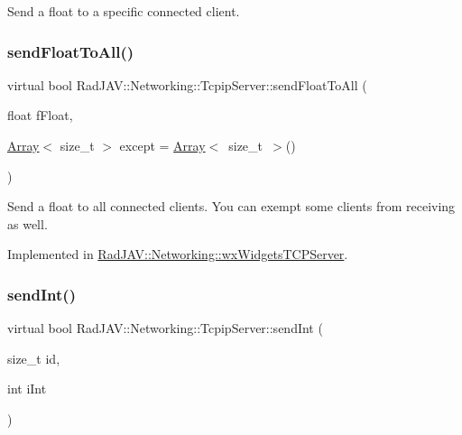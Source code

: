 Send a float to a specific connected client. \mbox{\label{class_rad_j_a_v_1_1_networking_1_1_tcpip_server_acbcaf04e37feb1dd153fcf719a408bc0}} 
\subsubsection{\texorpdfstring{send\+Float\+To\+All()}{sendFloatToAll()}}
{\footnotesize\ttfamily virtual bool Rad\+J\+A\+V\+::\+Networking\+::\+Tcpip\+Server\+::send\+Float\+To\+All (\begin{DoxyParamCaption}\item[{float}]{f\+Float,  }\item[{\mbox{\hyperlink{class_rad_j_a_v_1_1_array}{Array}}$<$ size\+\_\+t $>$}]{except = {\ttfamily \mbox{\hyperlink{class_rad_j_a_v_1_1_array}{Array}}$<$~size\+\_\+t~$>$()} }\end{DoxyParamCaption})\hspace{0.3cm}{\ttfamily [pure virtual]}}

Send a float to all connected clients. You can exempt some clients from receiving as well. 

Implemented in \mbox{\hyperlink{class_rad_j_a_v_1_1_networking_1_1wx_widgets_t_c_p_server_a632a5b94a16bcbd725fb4a9d1f4f73b0}{Rad\+J\+A\+V\+::\+Networking\+::wx\+Widgets\+T\+C\+P\+Server}}.

\mbox{\label{class_rad_j_a_v_1_1_networking_1_1_tcpip_server_a30e0e41500289006ad0ac4a8db803978}} 
\subsubsection{\texorpdfstring{send\+Int()}{sendInt()}}
{\footnotesize\ttfamily virtual bool Rad\+J\+A\+V\+::\+Networking\+::\+Tcpip\+Server\+::send\+Int (\begin{DoxyParamCaption}\item[{size\+\_\+t}]{id,  }\item[{int}]{i\+Int }\end{DoxyParamCaption})\hspace{0.3cm}{\ttfamily [pure virtual]}}

